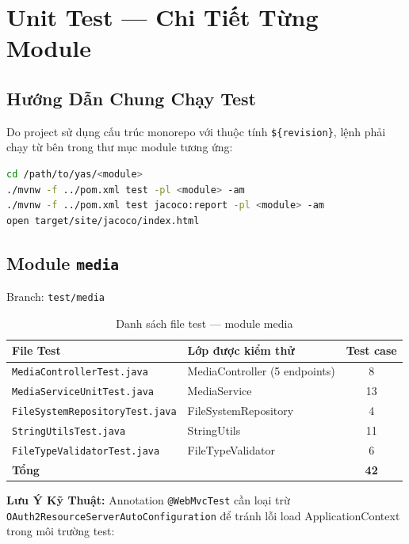 \section{Unit Test --- Chi Tiết Từng Module}

\subsection{Hướng Dẫn Chung Chạy Test}

Do project sử dụng cấu trúc monorepo với thuộc tính \texttt{\$\{revision\}}, lệnh phải chạy từ bên trong thư mục module tương ứng:

\begin{lstlisting}[language=sh, caption={Lệnh chạy test và tạo report JaCoCo}]
cd /path/to/yas/<module>
./mvnw -f ../pom.xml test -pl <module> -am
./mvnw -f ../pom.xml test jacoco:report -pl <module> -am
open target/site/jacoco/index.html
\end{lstlisting}

\subsection{Module \texttt{media}}

Branch: \texttt{test/media}

\begin{table}[H]
\centering
\caption{Danh sách file test --- module media}
\begin{tabular}{|l|l|c|}
\hline
\textbf{File Test} & \textbf{Lớp được kiểm thử} & \textbf{Test case} \\
\hline
\texttt{MediaControllerTest.java} & MediaController (5 endpoints) & 8 \\
\hline
\texttt{MediaServiceUnitTest.java} & MediaService & 13 \\
\hline
\texttt{FileSystemRepositoryTest.java} & FileSystemRepository & 4 \\
\hline
\texttt{StringUtilsTest.java} & StringUtils & 11 \\
\hline
\texttt{FileTypeValidatorTest.java} & FileTypeValidator & 6 \\
\hline
\textbf{Tổng} & & \textbf{42} \\
\hline
\end{tabular}
\end{table}

\textbf{Lưu Ý Kỹ Thuật:} Annotation \texttt{@WebMvcTest} cần loại trừ \texttt{OAuth2ResourceServerAutoConfiguration} để tránh lỗi load ApplicationContext trong môi trường test:

